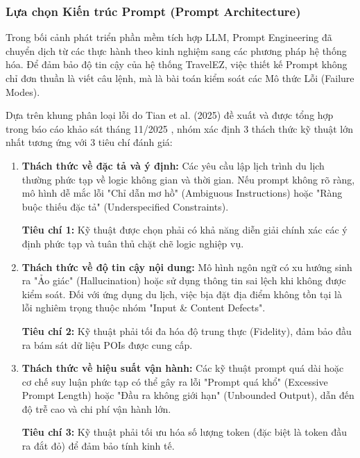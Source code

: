 \subsubsection{Lựa chọn Kiến trúc Prompt (Prompt Architecture)}


Trong bối cảnh phát triển phần mềm tích hợp LLM, Prompt Engineering đã chuyển dịch từ các thực hành theo kinh nghiệm sang các phương pháp hệ thống hóa. Để đảm bảo độ tin cậy của hệ thống TravelEZ, việc thiết kế Prompt không chỉ đơn thuần là viết câu lệnh, mà là bài toán kiểm soát các Mô thức Lỗi (Failure Modes).


Dựa trên khung phân loại lỗi do Tian et al. (2025) đề xuất và được tổng hợp trong báo cáo khảo sát tháng 11/2025 \cite{tian2025llm}, nhóm xác định 3 thách thức kỹ thuật lớn nhất tương ứng với 3 tiêu chí đánh giá:

\begin{enumerate}[label=\alph*., leftmargin=*]
    \item \textbf{Thách thức về đặc tả và ý định:} Các yêu cầu lập lịch trình du lịch thường phức tạp về logic không gian và thời gian. Nếu prompt không rõ ràng, mô hình dễ mắc lỗi "Chỉ dẫn mơ hồ" (Ambiguous Instructions) hoặc "Ràng buộc thiếu đặc tả" (Underspecified Constraints).
    
    \textbf{Tiêu chí 1:} Kỹ thuật được chọn phải có khả năng diễn giải chính xác các ý định phức tạp và tuân thủ chặt chẽ logic nghiệp vụ.
    
    \item \textbf{Thách thức về độ tin cậy nội dung:} Mô hình ngôn ngữ có xu hướng sinh ra "Ảo giác" (Hallucination) hoặc sử dụng thông tin sai lệch khi không được kiểm soát. Đối với ứng dụng du lịch, việc bịa đặt địa điểm không tồn tại là lỗi nghiêm trọng thuộc nhóm "Input \& Content Defects".
    
    \textbf{Tiêu chí 2:} Kỹ thuật phải tối đa hóa độ trung thực (Fidelity), đảm bảo đầu ra bám sát dữ liệu POIs được cung cấp.
    
    \item \textbf{Thách thức về hiệu suất vận hành:} Các kỹ thuật prompt quá dài hoặc cơ chế suy luận phức tạp có thể gây ra lỗi "Prompt quá khổ" (Excessive Prompt Length) hoặc "Đầu ra không giới hạn" (Unbounded Output), dẫn đến độ trễ cao và chi phí vận hành lớn.
    
    \textbf{Tiêu chí 3:} Kỹ thuật phải tối ưu hóa số lượng token (đặc biệt là token đầu ra đắt đỏ) để đảm bảo tính kinh tế.
\end{enumerate}

